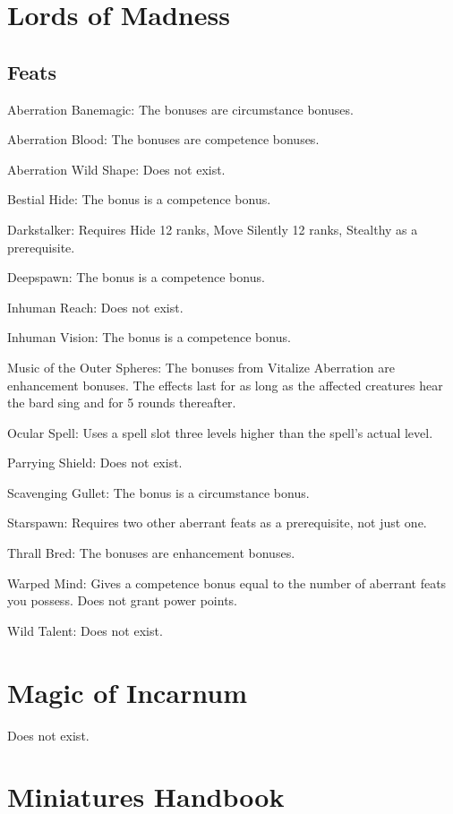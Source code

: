 \section{Lords of Madness}
\subsection{Feats}
\begin{itemize*}
\item Aberration Banemagic: The bonuses are circumstance bonuses.
\item Aberration Blood: The bonuses are competence bonuses.
\item Aberration Wild Shape: Does not exist.
\item Bestial Hide: The bonus is a competence bonus.
\item Darkstalker: Requires Hide 12 ranks, Move Silently 12 ranks, Stealthy as a prerequisite.
\item Deepspawn: The bonus is a competence bonus.
\item Inhuman Reach: Does not exist.
\item Inhuman Vision: The bonus is a competence bonus.
\item Music of the Outer Spheres: The bonuses from Vitalize Aberration are enhancement bonuses. The effects last for as long as the affected creatures hear the bard sing and for 5 rounds thereafter.
\item Ocular Spell: Uses a spell slot three levels higher than the spell's actual level.
\item Parrying Shield: Does not exist.
\item Scavenging Gullet: The bonus is a circumstance bonus.
\item Starspawn: Requires two other aberrant feats as a prerequisite, not just one.
\item Thrall Bred: The bonuses are enhancement bonuses.
\item Warped Mind: Gives a competence bonus equal to the number of aberrant feats you possess. Does not grant power points.
\item Wild Talent: Does not exist.
\end{itemize*}

\section{Magic of Incarnum}
Does not exist.

\section{Miniatures Handbook}
